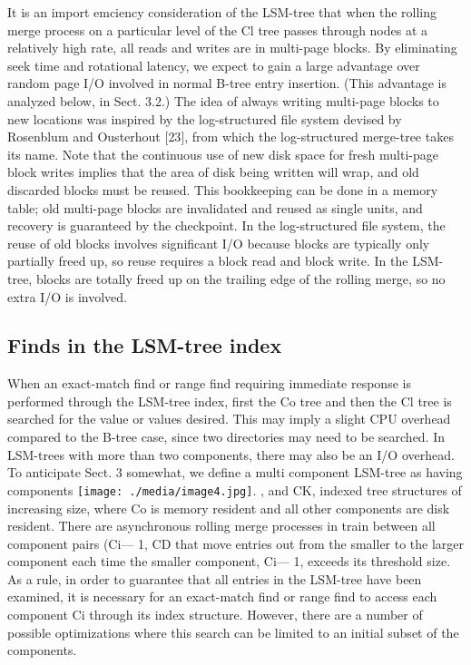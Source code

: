 \documentclass[a4paper,11pt,notitlepage,twoside,openright]{article}
\begin{document}
It is an import emciency consideration of the LSM-tree that when the
rolling merge process on a particular level of the Cl tree passes
through nodes at a relatively high rate, all reads and writes are in
multi-page blocks. By eliminating seek time and rotational latency, we
expect to gain a large advantage over random page I/O involved in normal
B-tree entry insertion. (This advantage is analyzed below, in Sect.
3.2.) The idea of always writing multi-page blocks to new locations was
inspired by the log-structured file system devised by Rosenblum and
Ousterhout {[}23{]}, from which the log-structured merge-tree takes its
name. Note that the continuous use of new disk space for fresh
multi-page block writes implies that the area of disk being written will
wrap, and old discarded blocks must be reused. This bookkeeping can be
done in a memory table; old multi-page blocks are invalidated and reused
as single units, and recovery is guaranteed by the checkpoint. In the
log-structured file system, the reuse of old blocks involves significant
I/O because blocks are typically only partially freed up, so reuse
requires a block read and block write. In the LSM-tree, blocks are
totally freed up on the trailing edge of the rolling merge, so no extra
I/O is involved.


\hypertarget{finds-in-the-lsm-tree-index}{%
\subsection{Finds in the LSM-tree
index}\label{finds-in-the-lsm-tree-index}}


When an exact-match find or range find requiring immediate response is
performed through the LSM-tree index, first the Co tree and then the Cl
tree is searched for the value or values desired. This may imply a
slight CPU overhead compared to the B-tree case, since two directories
may need to be searched. In LSM-trees with more than two components,
there may also be an I/O overhead. To anticipate Sect. 3 somewhat, we
define a multi component LSM-tree as having components
\texttt{[image: ./media/image4.jpg]}.
, and CK, indexed tree structures of increasing size, where Co is memory
resident and all other components are disk resident. There are
asynchronous rolling merge processes in train between all component
pairs (Ci--- 1, CD that move entries out from the smaller to the larger
component each time the smaller component, Ci--- 1, exceeds its
threshold size. As a rule, in order to guarantee that all entries in the
LSM-tree have been examined, it is necessary for an exact-match find or
range find to access each component Ci through its index structure.
However, there are a number of possible optimizations where this search
can be limited to an initial subset of the components.
\end{document}
